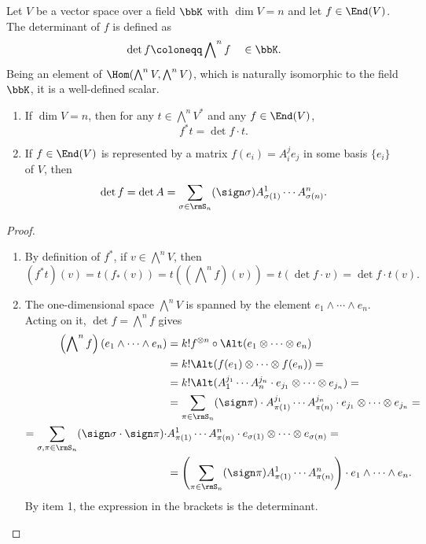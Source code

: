 \begin{defn}
Let $V$ be a vector space over a field $\bbK$ with $\dim V=n$ and let $f\in\End(V)$. The determinant of $f$ is defined as 
\[\det f\coloneqq \bigwedge\nolimits^n f\quad \in\bbK.\] 
Being an element of $\Hom(\bigwedge\nolimits^n V,\bigwedge\nolimits^n V)$, which is naturally isomorphic to the field $\bbK$, it is a well-defined scalar. 
\end{defn}
\begin{prop}
\begin{enumerate}
    \item If $\dim V=n$, then for any $t\in\bigwedge\nolimits^n V^\ast$ and any $f\in\End(V)$, 
    \[f^\ast t=\det f\cdot t.\]
    \item If $f\in\End(V)$ is represented by a matrix $f(e_i)=A_i^j e_j$ in some basis $\{e_i\}$ of $V$, then
    \[\det f=\det A=\sum_{\sigma\in \rmS_n}(\sign\sigma)A^1_{\sigma(1)}\cdots A^n_{\sigma(n)}.\]
\end{enumerate}
\end{prop}
\begin{proof}
\begin{enumerate}
    \item By definition of $f^\ast$, if $v\in \bigwedge\nolimits^n V$, then 
    \[(f^\ast t)(v)=t\left(f_\ast(v)\right)=t\left(\left(\bigwedge\nolimits^n f\right)(v)\right)=t(\det f\cdot v)=\det f\cdot t(v).\]
    \item The one-dimensional space $\bigwedge\nolimits^n V$ is spanned by the element $e_1\wedge \cdots \wedge e_n$. Acting on it, $\det f=\bigwedge\nolimits^n f$ gives
    \begin{align}
        \left(\bigwedge\nolimits^n f\right)(e_1\wedge \cdots \wedge e_n)&=k!f^{\otimes n}\circ \Alt (e_1\otimes \cdots \otimes e_n)\notag\\
        &=k!\Alt(f(e_1)\otimes\cdots\otimes f(e_n))=\notag
        \\
        &=k! \Alt (A^{j_1}_1 \cdots A^{j_n}_n \cdot e_{j_1}\otimes\cdots \otimes e_{j_n})=\notag\\
        &=\sum_{\pi\in \rmS_n}(\sign\pi)\cdot A_{\pi(1)}^{j_1}\cdots A_{\pi(n)}^{j_n}\cdot  e_{j_1}\otimes\cdots\otimes e_{j_n}=\notag
        \\
        =\sum_{\sigma,\pi\in \rmS_n}(\sign\sigma\cdot\sign\pi) \cdot &A_{\pi(1)}^1\cdots A_{\pi(n)}^n\cdot e_{\sigma(1)}\otimes\cdots\otimes e_{\sigma(n)}=\notag
        \\
        &=\left(\sum_{\pi\in \rmS_n}(\sign\pi)A^1_{\pi(1)}\cdots A^n_{\pi(n)}\right)\cdot e_1\wedge \cdots \wedge e_n.
    \end{align}
    By item 1, the expression in the brackets is the determinant.
\end{enumerate}
\end{proof}

